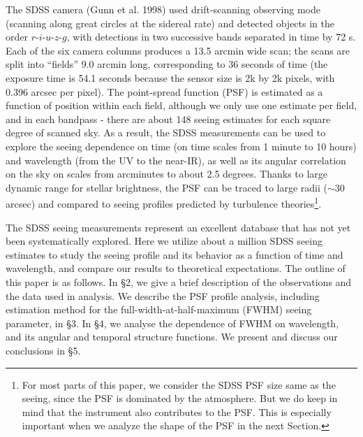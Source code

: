 The SDSS camera (Gunn et al. 1998) used drift-scanning observing mode (scanning along great circles
at the sidereal rate) and detected objects in the order 
$r$-$i$-$u$-$z$-$g$, with detections in two successive bands separated in time by 72 s. Each of the six camera
columns produces a 13.5 arcmin wide scan; the scans are split into ``fields'' 9.0 arcmin long, corresponding
to 36 seconds of time (the exposure time is 54.1 seconds because the sensor size is 2k by 2k pixels,
with 0.396 arcsec per pixel). 
The point-spread function (PSF) is estimated as a function of position
within each field, although we only use one estimate per field, and in each bandpass - there are about 
148 seeing estimates for each square degree of scanned sky. As a result, the SDSS measurements can
be used to explore the seeing dependence on time (on time scales from 1 minute to 10 hours) and 
wavelength (from the UV to the near-IR), as well as its angular correlation on the sky on scales from 
arcminutes to about 2.5 degrees. Thanks to large dynamic range for stellar brightness, the PSF can 
be traced to large radii ($\sim$30 arcsec) and compared to seeing profiles predicted by turbulence
theories\footnote{For most parts of this paper, we consider the SDSS PSF size
same as the seeing, since the PSF is dominated by the atmosphere. But we do
keep in mind that the instrument also contributes to the PSF. This is
especially important when we analyze the shape of the PSF in the next Section.}.

The SDSS seeing measurements represent an excellent database that has
not yet been systematically 
explored. Here we utilize about a million SDSS seeing estimates to study the seeing profile 
and its behavior as a function of time and wavelength, and compare our results to theoretical 
expectations. The outline of this paper is as follows. In \S2, we give a brief description of the 
observations and the data used in analysis. We describe the PSF profile analysis, 
including estimation method for the full-width-at-half-maximum (FWHM) seeing
parameter, in \S3. In \S4, we analyse the dependence of FWHM on wavelength, and its angular 
and temporal structure functions. We present and discuss our conclusions in \S5. 
